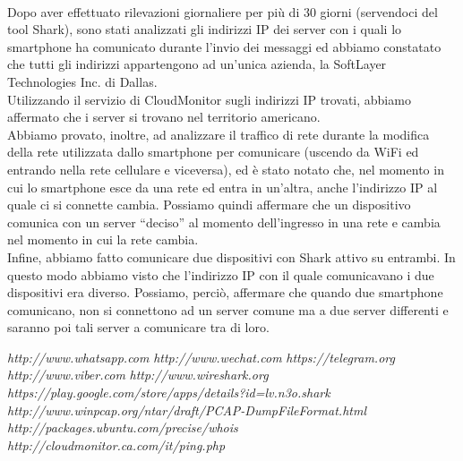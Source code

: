 \documentclass[a4paper,11pt]{book}
\begin{document}
~

Dopo aver effettuato rilevazioni giornaliere per pi\`u di 30 giorni (servendoci del tool Shark), sono stati analizzati gli indirizzi IP dei server con i quali lo smartphone ha comunicato durante l'invio dei messaggi ed abbiamo constatato che tutti gli indirizzi appartengono ad un'unica azienda, la SoftLayer Technologies Inc. di Dallas.\\
Utilizzando il servizio di CloudMonitor sugli indirizzi IP trovati, abbiamo affermato che i server si trovano nel territorio americano.\\
Abbiamo provato, inoltre, ad analizzare il traffico di rete durante la modifica della rete utilizzata dallo smartphone per comunicare (uscendo da WiFi ed entrando nella rete cellulare e viceversa), ed \`e stato notato che, nel momento in cui lo smartphone esce da una rete ed entra in un'altra, anche l'indirizzo IP al quale ci si connette cambia. Possiamo quindi affermare che un dispositivo comunica con un server ``deciso'' al momento dell'ingresso in una rete e cambia nel momento in cui la rete cambia.\\
Infine, abbiamo fatto comunicare due dispositivi con Shark attivo su entrambi. In questo modo abbiamo visto che l'indirizzo IP con il quale comunicavano i due dispositivi era diverso. Possiamo, perci\`o, affermare che quando due smartphone comunicano, non si connettono ad un server comune ma a due server differenti e saranno poi tali server a comunicare tra di loro. 

\begin{thebibliography}{}
 \emph{http://www.whatsapp.com}
 \emph{http://www.wechat.com}
 \emph{https://telegram.org}
 \emph{http://www.viber.com}
 \emph{http://www.wireshark.org}
 \emph{https://play.google.com/store/apps/details?id=lv.n3o.shark}
 \emph{http://www.winpcap.org/ntar/draft/PCAP-DumpFileFormat.html}
 \emph{http://packages.ubuntu.com/precise/whois}
 \emph{http://cloudmonitor.ca.com/it/ping.php}
\end{thebibliography}
\end{document}

